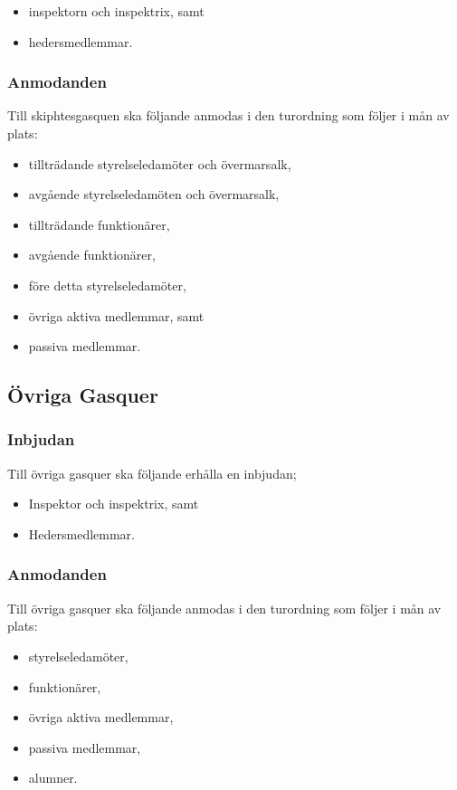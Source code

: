 \documentclass{dsekprotokoll}
\begin{document}
\begin{itemize}
    \item inspektorn och inspektrix, samt
    \item hedersmedlemmar.
\end{itemize}

\subsubsection{Anmodanden}

Till skiphtesgasquen ska följande anmodas i den turordning som följer i mån av plats:
  \begin{itemize}
    \item tillträdande styrelseledamöter och övermarsalk,
    \item avgående styrelseledamöten och övermarsalk,
    \item tillträdande funktionärer,
    \item avgående funktionärer,
    \item före detta styrelseledamöter,
    \item övriga aktiva medlemmar, samt
    \item passiva medlemmar.
  \end{itemize}

\subsection{Övriga Gasquer}
\subsubsection{Inbjudan}
Till övriga gasquer ska följande erhålla en inbjudan;
\begin{itemize}
    \item Inspektor och inspektrix, samt
    \item Hedersmedlemmar.
\end{itemize}

\subsubsection{Anmodanden}
Till övriga gasquer ska följande anmodas i den turordning som följer i mån av plats:
\begin{itemize}
    \item styrelseledamöter,
    \item funktionärer,
    \item övriga aktiva medlemmar,
    \item passiva medlemmar,
    \item alumner.
\end{itemize}
\end{document}
